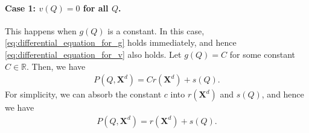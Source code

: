 \documentclass[11pt, a4paper]{article}
\begin{document}
\paragraph{Case 1: $v(Q) = 0$ for all $Q$.}
This happens when $g(Q)$ is a constant.
In this case, \eqref{eq:differential_equation_for_g} holds immediately, and hence \eqref{eq:differential_equation_for_v} also holds.
Let $g(Q) = C$ for some constant $C \in \mathbb{R}$.
Then, we have
\begin{align}
    P(Q, \bm{X}^{d}) = Cr(\bm{X}^{d}) + s(Q).
\end{align}
For simplicity, we can absorb the constant $c$ into $r(\bm{X}^{d})$ and $s(Q)$, and hence we have
\begin{align}
    P(Q, \bm{X}^{d}) = r(\bm{X}^{d}) + s(Q). \label{eq:inverse_demand_separable_step2_constant}
\end{align}
\end{document}
